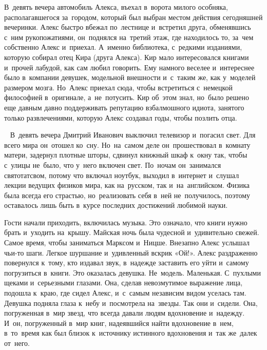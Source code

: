 В~девять вечера автомобиль Алекса, въехал в~ворота милого особняка, располагавшегося за~городом, который был выбран местом действия сегодняшней вечеринки.
Алекс быстро вбежал по~лестнице и~встретил друга, обменявшись с~ним рукопожатиями, он~поднялся на~третий этаж, где находилось то, за~чем собственно Алекс и~приехал.
А~именно библиотека, с~редкими изданиями, которую собирал отец Кира (друга Алекса).
Кир мало интересовался книгами и~прочей лабудой, как сам любил говорить.
Ему намного веселее и~интереснее было в~компании девушек, модельной внешности и~с~таким же, как у~моделей размером мозга.
Но~Алекс приехал сюда, чтобы встретиться с~немецкой философией в~оригинале, а~не~потусить.
Кир об~этом знал, но~было решено еще давным давно поддерживать репутацию взбалмошного идиота, занятого только развлечениями, которую Алекс создавал годы, чтобы позлить отца.

~
В~девять вечера Дмитрий Иванович выключил телевизор и~погасил свет.
Для всего мира он~отошел ко~сну.
Но~на~самом деле он~прошествовал в~комнату матери, задернул плотные шторы, сдвинул книжный шкаф к~окну так, чтобы с~улицы не~было, что у~него включен свет.
По~ночам он~занимался святотатсвом, потому что включал ноутбук, выходил в~интернет и~слушал лекции ведущих физиков мира, как на~русском, так и~на~английском.
Физика была всегда его страстью, но~реализовать себя в~ней не~получилось, поэтому оставалось лишь быть в~курсе последних достижений любимой науки.
 
Гости начали приходить, включилась музыка.
Это означало, что книги нужно брать и~уходить на~крышу.
Майская ночь была чудесной и~удивительно свежей.
Самое время, чтобы заниматься Марксом и~Ницше.
Внезапно Алекс услышал чьи-то шаги.
Легкое шуршание и~удивленный вскрик «Ой!».
Алекс раздраженно повернулся к~тому, кто издавал звук, в~надежде заставить его уйти и~самому погрузиться в~книги.
Это оказалась девушка.
Не~модель.
Маленькая.
С~пухлыми щеками и~серьезными глазами.
Она, сделав невозмутимое выражение лица, подошла к~краю, где сидел Алекс, и~с~самым независим видом уселась там.
Девушка подняла глаза к~небу и~посмотрела на~звезды.
Так они и~сидели.
Она, погруженная в~мир звезд, что всегда давали людям вдохновение и~надежду.
И~он, погруженный в~мир книг, надеявшийся найти вдохновение в~нем, в~то~время как был близок к~источнику истинного вдохновения и~так же~далек от~него.
 

~

